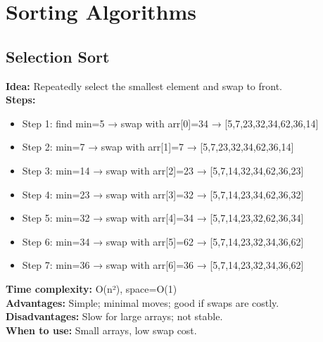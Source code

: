 \documentclass[a4paper,12pt]{article}
\begin{document}
\section{Sorting Algorithms}

\subsection{Selection Sort}
\textbf{Idea:} Repeatedly select the smallest element and swap to front.  \\
\textbf{Steps:}
\begin{itemize}
\item Step 1: find min=5 → swap with arr[0]=34 → [5,7,23,32,34,62,36,14]

\item Step 2: min=7 → swap with arr[1]=7 → [5,7,23,32,34,62,36,14]

\item Step 3: min=14 → swap with arr[2]=23 → [5,7,14,32,34,62,36,23]

\item Step 4: min=23 → swap with arr[3]=32 → [5,7,14,23,34,62,36,32]

\item Step 5: min=32 → swap with arr[4]=34 → [5,7,14,23,32,62,36,34]

\item Step 6: min=34 → swap with arr[5]=62 → [5,7,14,23,32,34,36,62]

\item Step 7: min=36 → swap with arr[6]=36 → [5,7,14,23,32,34,36,62]
\end{itemize}
\textbf{Time complexity:} O(n²), space=O(1)\\
\textbf{Advantages:} Simple; minimal moves; good if swaps are costly.\\
\textbf{Disadvantages:} Slow for large arrays; not stable.\\
\textbf{When to use:} Small arrays, low swap cost.
\end{document}
